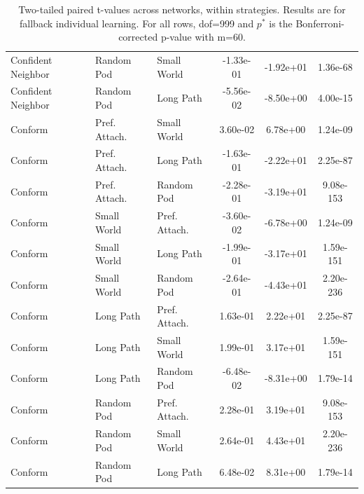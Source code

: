 \begin{table}[]
\begin{tabular}{l|ll|ccc}
Confident Neighbor&Random Pod&Small World&-1.33e-01&-1.92e+01&1.36e-68\\
Confident Neighbor&Random Pod&Long Path&-5.56e-02&-8.50e+00&4.00e-15\\
\hline
Conform&Pref. Attach.&Small World&3.60e-02&6.78e+00&1.24e-09\\
Conform&Pref. Attach.&Long Path&-1.63e-01&-2.22e+01&2.25e-87\\
Conform&Pref. Attach.&Random Pod&-2.28e-01&-3.19e+01&9.08e-153\\
Conform&Small World&Pref. Attach.&-3.60e-02&-6.78e+00&1.24e-09\\
Conform&Small World&Long Path&-1.99e-01&-3.17e+01&1.59e-151\\
Conform&Small World&Random Pod&-2.64e-01&-4.43e+01&2.20e-236\\
Conform&Long Path&Pref. Attach.&1.63e-01&2.22e+01&2.25e-87\\
Conform&Long Path&Small World&1.99e-01&3.17e+01&1.59e-151\\
Conform&Long Path&Random Pod&-6.48e-02&-8.31e+00&1.79e-14\\
Conform&Random Pod&Pref. Attach.&2.28e-01&3.19e+01&9.08e-153\\
Conform&Random Pod&Small World&2.64e-01&4.43e+01&2.20e-236\\
Conform&Random Pod&Long Path&6.48e-02&8.31e+00&1.79e-14\\
\hline
    \end{tabular}
    \caption{Two-tailed paired t-values across networks, within strategies. Results are for fallback individual learning. For all rows, dof=999 and $p^*$ is the Bonferroni-corrected p-value with m=60.}
    \label{tab:t-instrat-fallback}
\end{table}

